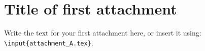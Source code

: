 \newpage 									%
\appendix 								 	%

\chapter{Title of first attachment}
Write the text for your first attachment here, or insert it using: \texttt{\textbackslash input\{attachment\_A.tex\}}.